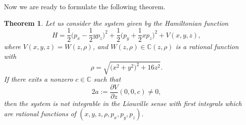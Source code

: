\documentclass[pdftex]{sigma}
\numberwithin{equation}{section}
\newtheorem{Theorem}{Theorem}[section]
\begin{document}
Now we are ready to formulate the following theorem.
\begin{Theorem} %
 Let us consider the system given by the Hamiltonian function
 \begin{equation}
 \label{eq:gen}
 H = \frac12 \bigg(p_x - \frac12 y p_z\bigg)^2 + \frac12\bigg(p_y+\frac12 x p_z\bigg)^2
 + V(x,y,z),
 \end{equation}
 where $V(x,y,z)=W(z,\rho)$, and $W(z,\rho)\in\mathbb{C}(z,\rho)$ is a
 rational function with
 \[
 \rho=\sqrt{\big(x^2+y^2\big)^2+{16}z^2}.
 \]
 If there exits a nonzero $c\in \mathbb{C}$ such
 that
 \begin{equation}
 \label{eq:con}
2a:= \frac{\partial V}{\partial z}(0,0,c) \neq 0,
 \end{equation}
 then the system is not integrable in the Liouville sense with first
 integrals which are rational functions of
 $(x,y,z, \rho, p_x,p_y,p_z)$.
\end{Theorem}
\end{document}
